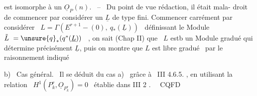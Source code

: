 
est isomorphe à un $\underline{O}_P(n)$. \ -- \ Du point de vue rédaction, il était mala-%
droit de commencer par considérer un $\underline{L}$ de type fini. Commencer carrément
par considérer \ $L = \Gamma(E^{r+1}-(0),\ q_*(\underline{L}))$ \ définissant le Module
$\tilde{L} \ = \unsure{q}_*(q^*(\underline{L}))$ \ , on sait (Chap II) que \ $L$ estb un Module gradué qui
détermine précisément $\underline{L}$, puis on montre que $L$ est libre 
gradué \ par le raisonnement indiqué\hand{:}

b) \ Cas général. \ Il se déduit du cas a) \ grâce à \ III 4.6.5. , en
utilisant la relation \ $H^1(P^r_k,\underline{O}_{P^r_k}) = 0$ \ établie dans III 2 . \ \ CQFD

